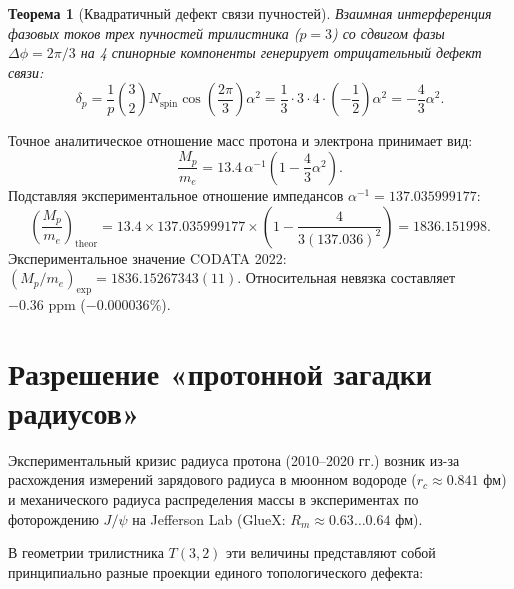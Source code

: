 \documentclass[11pt,a4paper]{article}
\newtheorem{theorem}{Теорема}
\theoremstyle{definition}
\theoremstyle{remark}
\begin{document}
\begin{theorem}[Квадратичный дефект связи пучностей]
Взаимная интерференция фазовых токов трех пучностей трилистника ($p=3$) со сдвигом фазы $\Delta \phi = 2\pi/3$ на 4 спинорные компоненты генерирует отрицательный дефект связи:
\begin{equation}
    \delta_p = \frac{1}{p} \binom{3}{2} N_{\mathrm{spin}} \cos\left(\frac{2\pi}{3}\right) \alpha^2 = \frac{1}{3} \cdot 3 \cdot 4 \cdot \left(-\frac{1}{2}\right) \alpha^2 = -\frac{4}{3}\alpha^2.
\end{equation}
\end{theorem}

Точное аналитическое отношение масс протона и электрона принимает вид:
\begin{equation}
    \frac{M_p}{m_e} = 13.4 \, \alpha^{-1} \left( 1 - \frac{4}{3}\alpha^2 \right).
    \label{eq:mp_me_ratio}
\end{equation}
Подставляя экспериментальное отношение импедансов $\alpha^{-1} = 137.035999177$:
\begin{equation}
    \left(\frac{M_p}{m_e}\right)_{\mathrm{theor}} = 13.4 \times 137.035999177 \times \left(1 - \frac{4}{3(137.036)^2}\right) = \mathbf{1836.151998}.
\end{equation}
Экспериментальное значение CODATA 2022: $(M_p/m_e)_{\mathrm{exp}} = 1836.15267343(11)$. Относительная невязка составляет $-0.36\text{ ppm}$ ($-0.000036\%$).

\section{Разрешение «протонной загадки радиусов»}
Экспериментальный кризис радиуса протона (2010--2020 гг.) возник из-за расхождения измерений зарядового радиуса в мюонном водороде ($r_c \approx 0.841\text{ фм}$) и механического радиуса распределения массы в экспериментах по фоторождению $J/\psi$ на Jefferson Lab (GlueX: $R_m \approx 0.63\dots 0.64\text{ фм}$).

В геометрии трилистника $T(3,2)$ эти величины представляют собой принципиально разные проекции единого топологического дефекта:
\end{document}
